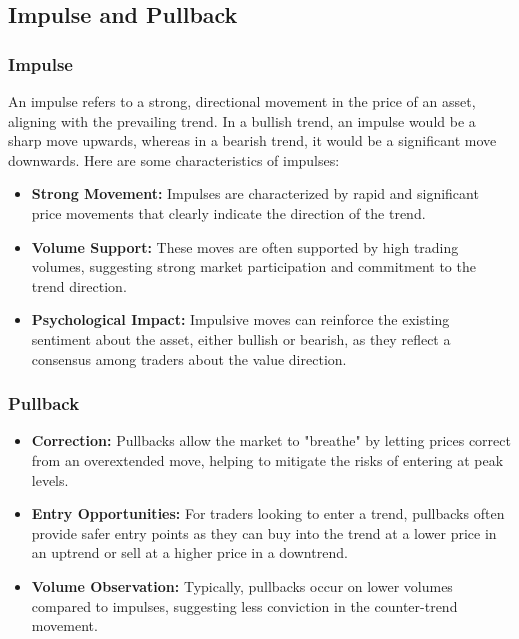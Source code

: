 \documentclass{report}
\begin{document}
    \pagebreak 
    \bigbreak \noindent 
    \subsection{Impulse and Pullback}
    \bigbreak \noindent 
    \subsubsection{Impulse}
    \bigbreak \noindent 
    An impulse refers to a strong, directional movement in the price of an asset, aligning with the prevailing trend. In a bullish trend, an impulse would be a sharp move upwards, whereas in a bearish trend, it would be a significant move downwards. Here are some characteristics of impulses:
    \begin{itemize}
        \item \textbf{Strong Movement:} Impulses are characterized by rapid and significant price movements that clearly indicate the direction of the trend.
        \item \textbf{Volume Support:} These moves are often supported by high trading volumes, suggesting strong market participation and commitment to the trend direction.
        \item \textbf{Psychological Impact:} Impulsive moves can reinforce the existing sentiment about the asset, either bullish or bearish, as they reflect a consensus among traders about the value direction.
    \end{itemize}
    \bigbreak \noindent 
    \subsubsection{Pullback}
    \bigbreak \noindent 
    \begin{itemize}
        \item \textbf{Correction:} Pullbacks allow the market to "breathe" by letting prices correct from an overextended move, helping to mitigate the risks of entering at peak levels.
        \item \textbf{Entry Opportunities:} For traders looking to enter a trend, pullbacks often provide safer entry points as they can buy into the trend at a lower price in an uptrend or sell at a higher price in a downtrend.
        \item \textbf{Volume Observation:} Typically, pullbacks occur on lower volumes compared to impulses, suggesting less conviction in the counter-trend movement.
    \end{itemize}
\end{document}
